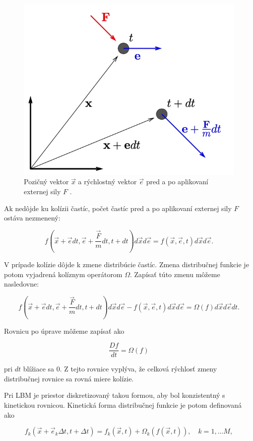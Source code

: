 \documentclass[]{tukediphc}
\begin{document}
\begin{figure}[!ht]
	\centering
	\includegraphics[width=.4\textwidth,angle=0]{figures/collision-vector.jpg}
	\caption{Pozičný vektor $\vec{x}$ a rýchlostný vektor $\vec{e}$ pred a po aplikovaní externej sily $F$ \citep{Mele2013}.}
\end{figure}

Ak nedôjde ku kolízii častíc, počet častíc pred a po aplikovaní externej sily $F$ ostáva nezmenený:

\begin{equation}
f(\vec{x} + \vec{e}dt, \vec{e} + \frac{\vec{F}}{m}dt, t + dt)d\vec{x}d\vec{e} = f(\vec{x},\vec{e},t)d\vec{x}d\vec{e}.
\end{equation}

V prípade kolízie dôjde k zmene distribúcie častíc. Zmena distribučnej funkcie je potom vyjadrená kolíznym operátorom $\Omega$. Zapísať túto zmenu môžeme nasledovne:

\begin{equation}
f(\vec{x} + \vec{e}dt, \vec{e} + \frac{\vec{F}}{m}dt, t + dt)d\vec{x}d\vec{e} - f(\vec{x},\vec{e},t)d\vec{x}d\vec{e} = \Omega(f)d\vec{x}d\vec{e}dt.
\end{equation}

Rovnicu po úprave môžeme zapísať ako

\begin{equation}
\frac{Df}{dt} = \Omega(f)
\end{equation}

pri $dt$ blížiace sa 0. Z tejto rovnice vyplýva, že celková rýchlosť zmeny distribučnej rovnice sa rovná miere kolízie. 

Pri LBM je priestor diskretizovaný takou formou, aby bol konzistentný s kinetickou rovnicou. Kinetická forma distribučnej funkcie je potom definovaná ako

\begin{equation}
f_k(\vec{x} + \vec{e}_k \Delta t,  t + \Delta t) = f_k(\vec{x},t) + \Omega_k(f(\vec{x},t)), \quad k = 1, ...M,
\end{equation}
\end{document}
